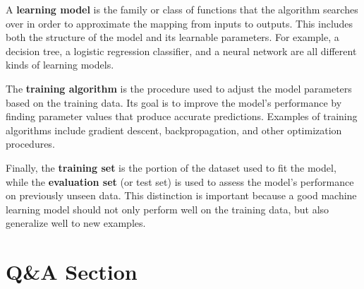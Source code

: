 \documentclass{article}
\begin{document}
A \textbf{learning model} is the family or class of functions that the algorithm searches over in order to approximate the mapping from inputs to outputs. This includes both the structure of the model and its learnable parameters. For example, a decision tree, a logistic regression classifier, and a neural network are all different kinds of learning models.

The \textbf{training algorithm} is the procedure used to adjust the model parameters based on the training data. Its goal is to improve the model’s performance by finding parameter values that produce accurate predictions. Examples of training algorithms include gradient descent, backpropagation, and other optimization procedures.

Finally, the \textbf{training set} is the portion of the dataset used to fit the model, while the \textbf{evaluation set} (or test set) is used to assess the model’s performance on previously unseen data. This distinction is important because a good machine learning model should not only perform well on the training data, but also generalize well to new examples.

\section{Q\&A Section}
\end{document}
